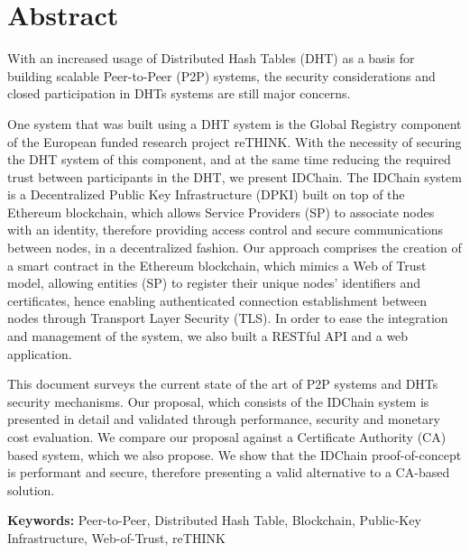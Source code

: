 \chapter*{Abstract}


With an increased usage of Distributed Hash Tables (DHT) as a basis for building scalable Peer-to-Peer (P2P) systems, the security considerations and closed participation in DHTs systems are still major concerns.

One system that was built using a DHT system is the Global Registry component of the European funded research project reTHINK.
With the necessity of securing the DHT system of this component, and at the same time reducing the required trust between participants in the DHT, we present IDChain.
The IDChain system is a Decentralized Public Key Infrastructure (DPKI) built on top of the Ethereum blockchain, which allows Service Providers (SP) to associate nodes with an identity, therefore providing access control and secure communications between nodes, in a decentralized fashion.
Our approach comprises the creation of a smart contract in the Ethereum blockchain, which mimics a Web of Trust model, allowing entities (SP) to register their unique nodes' identifiers and certificates, hence enabling authenticated connection establishment between nodes through Transport Layer Security (TLS).
In order to ease the integration and management of the system, we also built a RESTful API and a web application.

This document surveys the current state of the art of P2P systems and DHTs security mechanisms.
Our proposal, which consists of the IDChain system is presented in detail and validated through performance, security and monetary cost evaluation.
We compare our proposal against a Certificate Authority (CA) based system, which we also propose.
We show that the IDChain proof-of-concept is performant and secure, therefore presenting a valid alternative to a CA-based solution.

\vspace{1cm}

\textbf{\Large Keywords:} Peer-to-Peer, Distributed Hash Table, Blockchain, Public-Key Infrastructure, Web-of-Trust, reTHINK

\cleardoublepage
